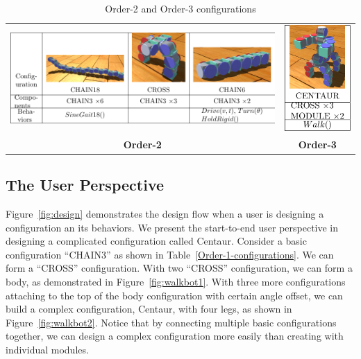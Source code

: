 \documentclass[graybox]{svmult}
\begin{document}
\begin{table}
    \begin{center}
        \begin{tabular}{c c}
        \includegraphics[scale=0.9]{images/library/tier2.pdf} &
        \includegraphics[scale=1]{images/library/tier3.pdf} \\
        \textbf{Order-2} & \textbf{Order-3}
        \end{tabular}
        \caption{Order-2 and Order-3 configurations}
        \label{Order-2-configurations}
    \end{center}
\end{table}

\subsection{The User Perspective}
Figure~\ref{fig:design} demonstrates the design flow when a user is designing a configuration an its behaviors. We present the start-to-end user perspective in designing a complicated configuration called Centaur. Consider a basic configuration ``CHAIN3'' as shown in Table~\ref{Order-1-configurations}. We can form a ``CROSS'' configuration. With two ``CROSS'' configuration, we can form a body, as demonstrated in Figure~\ref{fig:walkbot1}. With three more configurations attaching to the top of the body configuration with certain angle offset, we can build a complex configuration, Centaur, with four legs, as shown in Figure~\ref{fig:walkbot2}. Notice that by connecting multiple  basic configurations together, we can design a complex configuration more easily than creating with individual modules.
\end{document}
